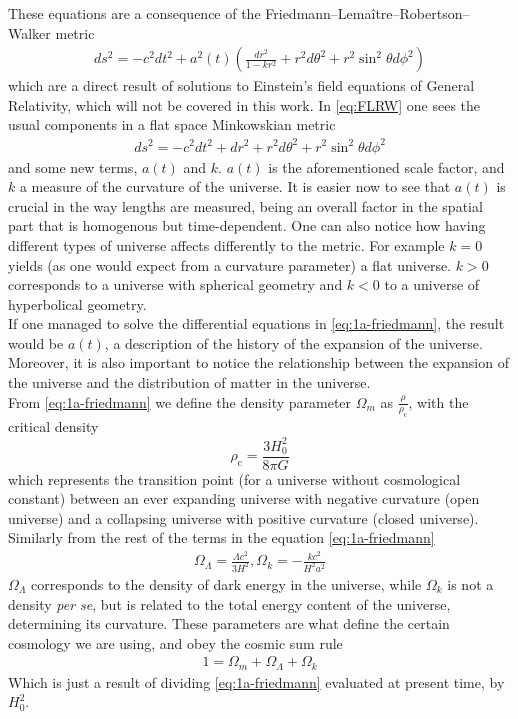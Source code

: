 These equations are a consequence of the Friedmann–Lemaître–Robertson–Walker metric \cite{cosmology}
\begin{align}
	ds ^2 = -c^2 dt^2  + a^2(t) \left( \frac{dr^2}{1-kr^2} +r^2d\theta ^2 + r^2 \sin^2\theta d\phi^2\right) 
	\label{eq:FLRW}
\end{align}which are a direct result of solutions to Einstein's field equations of General Relativity, which will not be covered in this work. In \eqref{eq:FLRW} one sees the usual components in a flat space Minkowskian metric 
\begin{align}
	ds^2 = -c^2dt^2 + dr^2 + r^2d\theta^2 + r^2 \sin^2\theta d\phi^2
\end{align} and some new terms, $a(t)$ and $k$. $a(t)$ is the aforementioned scale factor, and $k$ a measure of the curvature of the universe. It is easier now to see that $a(t)$ is crucial in the way lengths are measured, being an overall factor in the spatial part that is homogenous but time-dependent. One can also notice how having different types of universe affects differently to the metric. For example $k=0$ yields (as one would expect from a curvature parameter) a flat universe. $k>0$ corresponds to a universe with spherical geometry and $k<0$ to a universe of hyperbolical geometry. \\

If one managed to solve the differential equations in \eqref{eq:1a-friedmann}, the result would be $a(t)$, a description of the history of the expansion of the universe. Moreover, it is also important to notice the relationship between the expansion of the universe and the distribution of matter in the universe. \\

From \eqref{eq:1a-friedmann} we define the density parameter $\Omega_m$ as $\frac{\rho}{\rho_{\text{c}}}$, with the critical density $$\rho_{\text{c}} = \frac{3H_0^2}{8\pi G}$$ which represents the transition point (for a universe without cosmological constant) between an ever expanding universe with negative curvature (open universe) and a collapsing universe with positive curvature (closed universe). Similarly from the rest of the terms in the equation \eqref{eq:1a-friedmann}
\begin{align}
 \Omega_\Lambda = \frac{\Lambda c^2}{3H^2}, \Omega_k = -\frac{kc^2}{H^2a^2} 
 \label{eq:definitions}
\end{align}
$\Omega_\Lambda$ corresponds to the density of dark energy in the universe, while $\Omega_k$ is not a density \textit{per se}, but is related to the total energy content of the universe, determining its curvature.
These parameters are what define the certain cosmology we are using, and obey the cosmic sum rule 
\begin{align}
	1 = \Omega_m + \Omega_\Lambda + \Omega_k
	\label{eq:cosmic-sum-rule}
\end{align}
Which is just a result of dividing \eqref{eq:1a-friedmann} evaluated at present time, by  $H_0^2$. \\

